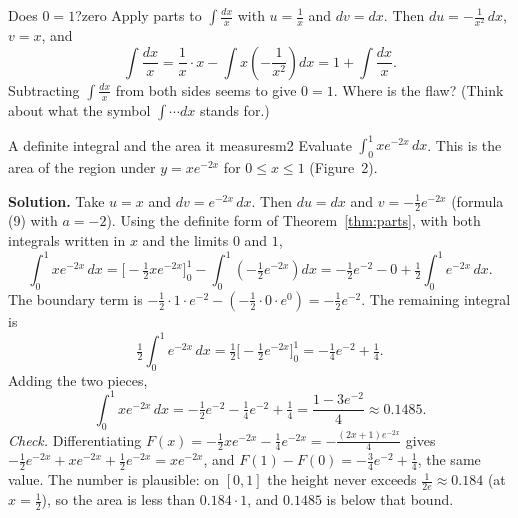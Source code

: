 \documentclass[11pt]{article}
\begin{document}
\begin{think}{Does $0=1$?}{zero}
Apply parts to $\int\frac{dx}{x}$ with $u=\frac1x$ and $dv=dx$. Then $du=-\frac1{x^2}\,dx$, $v=x$, and
\[\int\frac{dx}{x}=\frac1x\cdot x-\int x\left(-\frac1{x^2}\right)dx=1+\int\frac{dx}{x}.\]
Subtracting $\int\frac{dx}x$ from both sides seems to give $0=1$. Where is the flaw? (Think about what the symbol $\int\cdots dx$ stands for.)
\end{think}

\begin{exmp}{A definite integral and the area it measures}{m2}
Evaluate $\int_0^1xe^{-2x}\,dx$. This is the area of the region under $y=xe^{-2x}$ for $0\le x\le1$ (Figure~2).

\textbf{Solution.} Take $u=x$ and $dv=e^{-2x}\,dx$. Then $du=dx$ and $v=-\frac12e^{-2x}$ (formula (9) with $a=-2$). Using the definite form of Theorem~\ref{thm:parts}, with both integrals written in $x$ and the limits $0$ and $1$,
\[\int_0^1xe^{-2x}\,dx=\Big[-\tfrac12xe^{-2x}\Big]_0^1-\int_0^1\left(-\tfrac12e^{-2x}\right)dx=-\tfrac12e^{-2}-0+\tfrac12\int_0^1e^{-2x}\,dx .\]
The boundary term is $-\frac12\cdot1\cdot e^{-2}-\left(-\frac12\cdot0\cdot e^0\right)=-\frac12e^{-2}$. The remaining integral is
\[\tfrac12\int_0^1e^{-2x}\,dx=\tfrac12\Big[-\tfrac12e^{-2x}\Big]_0^1=-\tfrac14e^{-2}+\tfrac14 .\]
Adding the two pieces,
\[\int_0^1xe^{-2x}\,dx=-\tfrac12e^{-2}-\tfrac14e^{-2}+\tfrac14=\frac{1-3e^{-2}}4\approx0.1485 .\]
\emph{Check.} Differentiating $F(x)=-\frac12xe^{-2x}-\frac14e^{-2x}=-\frac{(2x+1)e^{-2x}}4$ gives $-\frac12e^{-2x}+xe^{-2x}+\frac12e^{-2x}=xe^{-2x}$, and $F(1)-F(0)=-\frac34e^{-2}+\frac14$, the same value. The number is plausible: on $[0,1]$ the height never exceeds $\frac1{2e}\approx0.184$ (at $x=\frac12$), so the area is less than $0.184\cdot1$, and $0.1485$ is below that bound.


\end{exmp}
\end{document}
